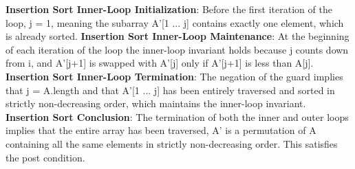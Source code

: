 \documentclass[onecolumn, 12pt, article]{IEEEtran}
\numberwithin{case}{problem}
\numberwithin{condition}{problem}
\numberwithin{condition}{subsection}
\numberwithin{definition}{section}
\theoremstyle{remark}
\numberwithin{question}{problem}
\theoremstyle{plain}
\numberwithin{answer}{problem}
\numberwithin{solution}{section}
\numberwithin{equation}{section}%
\begin{document}
\newline
\textbf{Insertion Sort Inner-Loop Initialization}: Before the first iteration of the loop, j = 1, meaning the subarray A'[1 ... j] contains exactly one element, which is already sorted.
\newline
\textbf{Insertion Sort Inner-Loop Maintenance}: At the beginning of each iteration of the loop the inner-loop invariant holds because j counts down from i, and A'[j+1] is swapped with A'[j] only if A'[j+1] is less than A[j].
\newline
\textbf{Insertion Sort Inner-Loop Termination}: The negation of the guard implies that j = A.length and that A'[1 ... j] has been entirely traversed and sorted in strictly non-decreasing order, which maintains the inner-loop invariant. 
\newline
\newline
\textbf{Insertion Sort Conclusion}: The termination of both the inner and outer loops implies that the entire array has been traversed, A' is a permutation of A containing all the same elements in strictly non-decreasing order. This satisfies the post condition.
\newline
\newline
\end{document}
